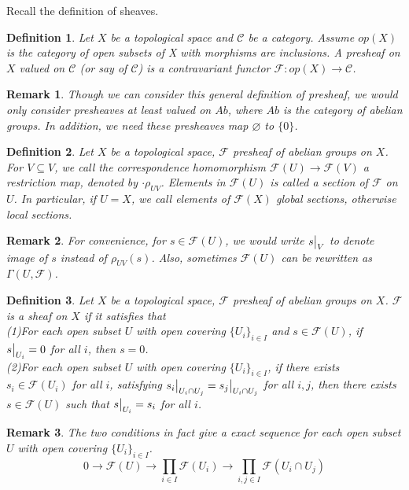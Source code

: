 \documentclass{ctexart}
\newtheorem{definition}{Definition}[section]
\newtheorem{remark}{Remark}[section]
\begin{document}
Recall the definition of sheaves.
\begin{definition}
    Let $X$ be a topological space and $\mathcal{C}$ be a category.
    Assume $op(X)$ is the category of open subsets of X with morphisms are inclusions.
    A presheaf on $X$ valued on $\mathcal{C}$ (or say of $\mathcal{C}$) is a contravariant functor $\mathcal{F}: op(X) \longrightarrow \mathcal{C}$.
\end{definition}
\begin{remark}
    Though we can consider this general definition of presheaf, we would only consider presheaves at least valued on $Ab$,
    where $Ab$ is the category of abelian groups.
    In addition, we need these presheaves map $\varnothing$ to $\{0\}$.
\end{remark}
\begin{definition}
    Let $X$ be a topological space, $\mathcal{F}$ presheaf of abelian groups on $X$.
    For $V \subseteq V$, we call the correspondence homomorphism $\mathcal{F}(U) \longrightarrow \mathcal{F}(V)$ a restriction map, denoted by $\cdot \rho_{UV}$.
    Elements in $\mathcal{F}(U)$ is called a section of $\mathcal{F}$ on $U$.
    In particular, if $U = X$, we call elements of $\mathcal{F}(X)$ global sections, otherwise local sections.
\end{definition}
\begin{remark}
    For convenience, for $s\in \mathcal{F}(U)$, we would write $s\big{|}_V$ to denote image of $s$ instead of $\rho_{UV}(s)$.
    Also, sometimes $\mathcal{F}(U)$ can be rewritten as $\Gamma(U, \mathcal{F})$.
\end{remark}
\begin{definition}
    Let $X$ be a topological space, $\mathcal{F}$ presheaf of abelian groups on $X$.
    $\mathcal{F}$ is a sheaf on $X$ if it satisfies that \\
    (1)For each open subset $U$ with open covering $\{U_{i}\}_{i\in I}$ and $s\in \mathcal{F}(U)$, 
    if $s\big{|}_{U_{i}} = 0$ for all $i$, then $s = 0$. \\
    (2)For each open subset $U$ with open covering $\{U_{i}\}_{i\in I}$,
    if there exists $s_{i}\in \mathcal{F}(U_{i})$ for all $i$, satisfying $s_{i}\big{|}_{U_{i} \cap U_{j}} = s_{j}\big{|}_{U_{i} \cap U_{j}}$ for all $i,j$,
    then there exists $s\in \mathcal{F}(U)$ such that $s\big{|}_{U_{i}} = s_{i}$ for all $i$.
\end{definition}
\begin{remark}
    The two conditions in fact give a exact sequence for each open subset $U$ with open covering $\{U_{i}\}_{i\in I}$.
    \begin{equation}
        0 \longrightarrow \mathcal{F}(U) \longrightarrow \prod_{i\in I} \mathcal{F}(U_{i}) \longrightarrow \prod_{i,j\in I} \mathcal{F}(U_{i} \cap U_{j})
    \end{equation}
\end{remark}
\end{document}
